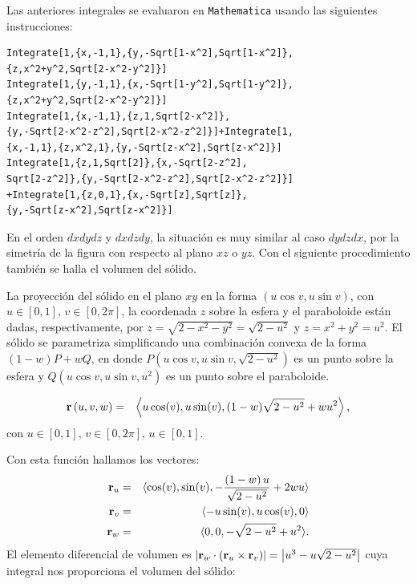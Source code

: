 Las anteriores integrales se evaluaron en \verb"Mathematica" usando las si\-guientes instrucciones:

\begin{tcolorbox}[title=\bf Instrucción en \verb"Mathematica"]\begin{Verbatim}[formatcom=\letraverbatim]
Integrate[1,{x,-1,1},{y,-Sqrt[1-x^2],Sqrt[1-x^2]},
{z,x^2+y^2,Sqrt[2-x^2-y^2]}]
Integrate[1,{y,-1,1},{x,-Sqrt[1-y^2],Sqrt[1-y^2]},
{z,x^2+y^2,Sqrt[2-x^2-y^2]}]
Integrate[1,{x,-1,1},{z,1,Sqrt[2-x^2]},
{y,-Sqrt[2-x^2-z^2],Sqrt[2-x^2-z^2]}]+Integrate[1,
{x,-1,1},{z,x^2,1},{y,-Sqrt[z-x^2],Sqrt[z-x^2]}]
Integrate[1,{z,1,Sqrt[2]},{x,-Sqrt[2-z^2],
Sqrt[2-z^2]},{y,-Sqrt[2-x^2-z^2],Sqrt[2-x^2-z^2]}]
+Integrate[1,{z,0,1},{x,-Sqrt[z],Sqrt[z]},
{y,-Sqrt[z-x^2],Sqrt[z-x^2]}]
\end{Verbatim}
\end{tcolorbox}

En el orden $dxdydz$ y $dxdzdy$, la situación es muy similar al caso $dydzdx$,
por la simetría de la figura con respecto al plano
$xz$ o $yz$. Con el siguiente procedimiento también se halla el volumen del sólido.

La proyección del sólido en el plano $xy$ en la forma $\left( u\cos v,u\sin v\right) $, con $u\in [0,1]$, $v\in [0,2\pi ]$, la coordenada $z$ sobre la esfera y el paraboloide están dadas, respectivamente, por $z =\sqrt{2-x^2-y^2}= \sqrt{2-u^2}$ y $z=x^2+y^2= u^2$.
El sólido se parametriza simplificando una combinación convexa de la forma $(1-w)P+wQ$,
en donde $P\left( u\cos v,u\sin v,\sqrt{2-u^2}\right)$ es un punto sobre la esfera y
$Q\left( u\cos v,u\sin v,u^2\right)$ es un punto sobre el paraboloide.

\begin{eqnarray*}
{\bf r}\left( u,v,w\right) &=& \left\langle u\cos (v) ,u\sin(v),(1-w) \sqrt{2-u^2}+wu^2\right \rangle ,
\end{eqnarray*}
%
con $u\in [0,1]$, $v\in [0,2\pi ]$, $u\in [0,1]$.

Con esta función hallamos los vectores:
\begin{eqnarray*}
{\bf r}_{u} &=& \langle \cos (v) ,\sin (v) ,-\frac{\left( 1-w\right) u}{\sqrt{2-u^2}}+2wu\rangle \\
{\bf r}_{v}&=& \langle -u\sin (v) ,u\cos (v) ,0\rangle \\
{\bf r}_{w} &=& \langle 0,0,-\sqrt{2-u^2}+u^2\rangle.
\end{eqnarray*}
%
El elemento diferencial de volumen es
$\left| {\bf r}_{w}\cdot \left( {\bf r}_{u}\times {\bf r}_{v}\right) \right| = \left| u^{3}-u\sqrt{2-u^2}\right|$
cuya integral nos proporciona el volumen del sólido:

